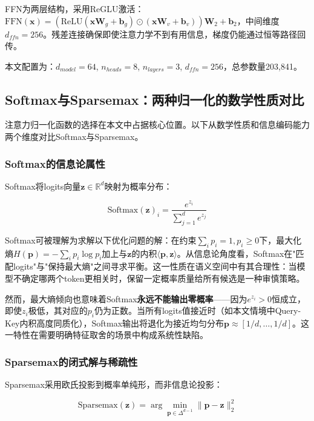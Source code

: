 FFN为两层结构，采用ReGLU激活\cite{gorishniy2021revisiting}：$\mathrm{FFN}(\mathbf{x}) = (\mathrm{ReLU}(\mathbf{x}\mathbf{W}_g + \mathbf{b}_g) \odot (\mathbf{x}\mathbf{W}_v + \mathbf{b}_v))\mathbf{W}_2 + \mathbf{b}_2$，中间维度$d_{ffn}=256$。残差连接确保即使注意力学不到有用信息，梯度仍能通过恒等路径回传。

本文配置为：$d_{model}=64$, $n_{heads}=8$, $n_{layers}=3$, $d_{ffn}=256$，总参数量203,841。

\subsection{Softmax与Sparsemax：两种归一化的数学性质对比}

注意力归一化函数的选择在本文中占据核心位置。以下从数学性质和信息编码能力两个维度对比Softmax与Sparsemax。

\subsubsection{Softmax的信息论属性}

Softmax将logits向量$\mathbf{z} \in \mathbb{R}^d$映射为概率分布：

\begin{equation}
\mathrm{Softmax}(\mathbf{z})_i = \frac{e^{z_i}}{\sum_{j=1}^d e^{z_j}}
\label{eq:softmax}
\end{equation}

Softmax可被理解为求解以下优化问题的解：在约束$\sum_i p_i = 1, p_i \geq 0$下，最大化熵$H(\mathbf{p}) = -\sum_i p_i \log p_i$加上与$\mathbf{z}$的内积$\langle \mathbf{p}, \mathbf{z} \rangle$。从信息论角度看，Softmax在"匹配logits"与"保持最大熵"之间寻求平衡。这一性质在语义空间中有其合理性：当模型不确定哪两个token更相关时，保留一定概率质量给所有候选是一种审慎策略。

然而，最大熵倾向也意味着Softmax\textbf{永远不能输出零概率}——因为$e^{z_i} > 0$恒成立，即使$z_i$极低，其对应的$p_i$仍为正数。当所有logits值接近时（如本文情境中Query-Key内积高度同质化），Softmax输出将退化为接近均匀分布$\mathbf{p} \approx [1/d, \dots, 1/d]$。这一特性在需要明确特征取舍的场景中构成系统性缺陷。

\subsubsection{Sparsemax的闭式解与稀疏性}

Sparsemax\cite{martins2016sparsemax}采用欧氏投影到概率单纯形，而非信息论投影：

\begin{equation}
\mathrm{Sparsemax}(\mathbf{z}) = \arg\min_{\mathbf{p} \in \Delta^{d-1}} \|\mathbf{p} - \mathbf{z}\|_2^2
\label{eq:sparsemax}
\end{equation}

